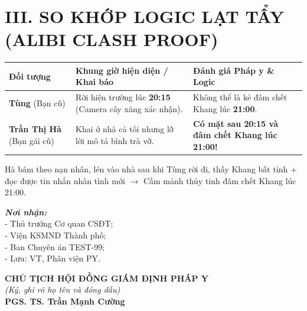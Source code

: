 \documentclass[12pt,a4paper]{article}
\begin{document}
\section*{III. SO KHỚP LOGIC LẠT TẨY (ALIBI CLASH PROOF)}

\begin{table}[h]
\centering
\begin{tabular}{|p{4.5cm}|p{5cm}|p{5cm}|}
\hline
\textbf{Đối tượng} & \textbf{Khung giờ hiện diện / Khai báo} & \textbf{Đánh giá Pháp y \& Logic} \\ \hline
\textbf{Tùng} (Bạn cũ) & Rời hiện trường lúc \textbf{20:15} (Camera cây xăng xác nhận). & Không thể là kẻ đâm chết Khang lúc \textbf{21:00}. \\ \hline
\textbf{Trần Thị Hà} (Bạn gái cũ) & Khai ở nhà cả tối nhưng lỡ lời mô tả bình trà vỡ. & \textbf{Có mặt sau 20:15 và đâm chết Khang lúc 21:00!} \\ \hline
\end{tabular}
\end{table}

\vspace{0.5cm}

\begin{tcolorbox}[colback=yellow!10!white,colframe=yellow!75!black,title=\textbf{KẾT LUẬN CHỦ CHỐT CHUYÊN ÁN}]
Hà bám theo nạn nhân, lén vào nhà sau khi Tùng rời đi, thấy Khang bất tỉnh + đọc được tin nhắn nhân tình mới $\rightarrow$ Cầm mảnh thủy tinh đâm chết Khang lúc 21:00.
\end{tcolorbox}

\vspace{0.8cm}

\noindent
\begin{minipage}[t]{0.45\textwidth}
    \textbf{\textit{Nơi nhận:}}\\
    \small{- Thủ trưởng Cơ quan CSĐT;}\\
    \small{- Viện KSMND Thành phố;}\\
    \small{- Ban Chuyên án TEST-99;}\\
    \small{- Lưu: VT, Phân viện PY.}
\end{minipage}
\hfill
\begin{minipage}[t]{0.5\textwidth}
    \begin{center}
        \textbf{CHỦ TỊCH HỘI ĐỒNG GIÁM ĐỊNH PHÁP Y}\\
        \textit{(Ký, ghi rõ họ tên và đóng dấu)}\\[1.5cm]
        \textbf{PGS. TS. Trần Mạnh Cường}
    \end{center}
\end{minipage}
\end{document}
